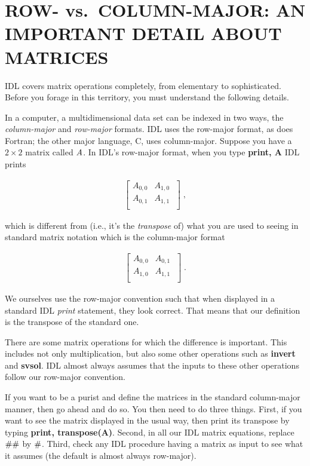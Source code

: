 \documentclass[psfig,preprint]{aastex}
\begin{document}
\section{ROW- vs.\ COLUMN-MAJOR: AN IMPORTANT DETAIL ABOUT MATRICES} \label{matrices}

	IDL covers matrix operations completely, from elementary to
sophisticated. Before you forage in this territory, you must understand
the following details.

        In a computer, a multidimensional data set can be indexed in two
ways, the {\it column-major} and {\it row-major} formats.  IDL uses the
row-major format, as does Fortran; the other major language, C, uses
column-major.  Suppose you have a $2 \times 2$ matrix called ${\it A}$. 
In IDL's row-major format, when you type {\bf print, A} IDL prints

\begin{mathletters} 
\begin{eqnarray} 
\left[ 
\begin{array}{rrr}
A_{0,0} & A_{1,0} \\
A_{0,1} & A_{1,1} \\
\end{array} 
\; \right] \; ,
\end{eqnarray} 

\noindent which is different from (i.e., it's the {\it transpose} of) what
you are used to seeing in standard matrix notation which is the
column-major format

\begin{eqnarray} 
\left[ 
\begin{array}{rrr}
A_{0,0} & A_{0,1} \\
A_{1,0} & A_{1,1} \\
\end{array} 
\; \right] \; .
\end{eqnarray} 
\end{mathletters} 

        We ourselves use the row-major convention such that when
displayed in a standard IDL {\it print} statement, they look
correct. That means that our definition is the transpose of the standard
one.

	There are some matrix operations for which the difference is
important. This includes not only multiplication, but also some other
operations such as {\bf invert} and {\bf svsol}. IDL almost always
assumes that the inputs to these other operations follow our row-major
convention. 

        If you want to be a purist and define the matrices in the
standard column-major manner, then go ahead and do so.  You then need to
do three things.  First, if you want to see the matrix displayed in the
usual way, then print its transpose by typing {\bf print,
transpose(A)}.  Second, in all our IDL matrix equations, replace ${\bf
\# \#}$ by ${\bf \#}$. Third, check any IDL procedure having a matrix as
input to see what it assumes (the default is almost always row-major). 
\end{document}
